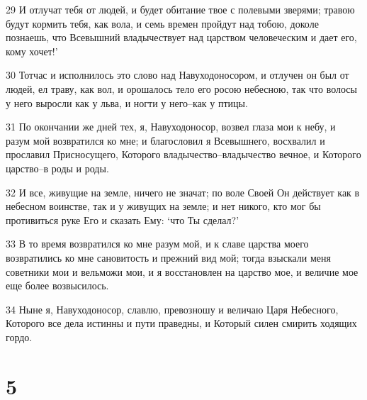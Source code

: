 \par 29 И отлучат тебя от людей, и будет обитание твое с полевыми зверями; травою будут кормить тебя, как вола, и семь времен пройдут над тобою, доколе познаешь, что Всевышний владычествует над царством человеческим и дает его, кому хочет!'
\par 30 Тотчас и исполнилось это слово над Навуходоносором, и отлучен он был от людей, ел траву, как вол, и орошалось тело его росою небесною, так что волосы у него выросли как у льва, и ногти у него--как у птицы.
\par 31 По окончании же дней тех, я, Навуходоносор, возвел глаза мои к небу, и разум мой возвратился ко мне; и благословил я Всевышнего, восхвалил и прославил Присносущего, Которого владычество--владычество вечное, и Которого царство--в роды и роды.
\par 32 И все, живущие на земле, ничего не значат; по воле Своей Он действует как в небесном воинстве, так и у живущих на земле; и нет никого, кто мог бы противиться руке Его и сказать Ему: `что Ты сделал?'
\par 33 В то время возвратился ко мне разум мой, и к славе царства моего возвратились ко мне сановитость и прежний вид мой; тогда взыскали меня советники мои и вельможи мои, и я восстановлен на царство мое, и величие мое еще более возвысилось.
\par 34 Ныне я, Навуходоносор, славлю, превозношу и величаю Царя Небесного, Которого все дела истинны и пути праведны, и Который силен смирить ходящих гордо.

\chapter{5}

